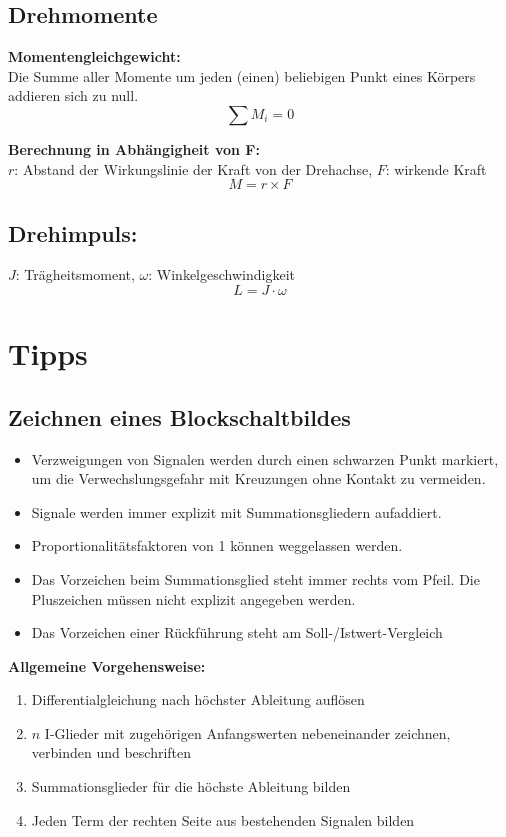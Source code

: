 \documentclass[10pt,a4paper]{article}
\begin{document}
\subsection{Drehmomente}
\textbf{Momentengleichgewicht:} \\
Die Summe aller Momente um jeden (einen) beliebigen Punkt eines Körpers addieren sich zu null.
$$
	\sum M_i = 0
$$

\textbf{Berechnung in Abhängigheit von F:} \\
$r$: Abstand der Wirkungslinie der Kraft von der Drehachse, $F$: wirkende Kraft
$$
	M = r \times F
$$

\subsection{Drehimpuls:}
$J$: Trägheitsmoment, $\omega$: Winkelgeschwindigkeit
$$
	L = J ⋅ \omega
$$


\section{Tipps}
\subsection{Zeichnen eines Blockschaltbildes}
\begin{itemize}
	\item Verzweigungen von Signalen werden durch einen schwarzen Punkt markiert, um die Verwechslungsgefahr mit Kreuzungen ohne Kontakt zu vermeiden.
	\item Signale werden immer explizit mit Summationsgliedern aufaddiert.
	\item Proportionalitätsfaktoren von 1 können weggelassen werden.
	\item Das Vorzeichen beim Summationsglied steht immer rechts vom Pfeil. Die Pluszeichen müssen nicht explizit angegeben werden.
	\item Das Vorzeichen einer Rückführung steht am Soll-/Istwert-Vergleich
\end{itemize}
\textbf{Allgemeine Vorgehensweise:}
\begin{enumerate}
	\item Differentialgleichung nach höchster Ableitung auflösen
	\item $n$ I-Glieder mit zugehörigen Anfangswerten nebeneinander zeichnen, verbinden und beschriften
	\item Summationsglieder für die höchste Ableitung bilden
	\item Jeden Term der rechten Seite aus bestehenden Signalen bilden
\end{enumerate}
\end{document}

